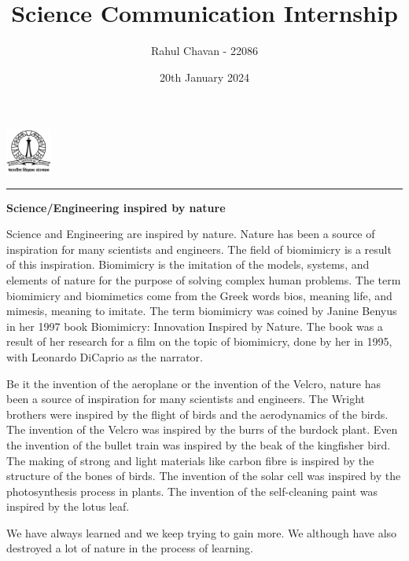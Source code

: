 \documentclass[12pt]{article}
\title{\textbf{ Science Communication Internship}}
\author{Rahul Chavan - 22086}
\date{20th January 2024}
\renewcommand{\maketitle}{
 \begin{center}
    \includegraphics[width=1.5cm]{IISc_Master_Seal_Black.jpg}
    \vspace{0.5cm}

    \Large
    \textbf{\thetitle}
    
    \vspace{0.3cm}
    
    \large
    \theauthor
    
    \vspace{0.2cm}

    
    
    \large
    \thedate
    \vspace{0.2cm}

    \hrule  
    
    
  
  \end{center}
}
\begin{document}
\maketitle
  \begin{center} \Large
    \textbf{Science/Engineering inspired by nature}
  \end{center} 

Science and Engineering are inspired by nature. Nature has been a source of inspiration for many scientists and engineers.
The field of biomimicry is a result of this inspiration. 
Biomimicry is the imitation of the models, systems, and elements of nature for the purpose 
of solving complex human problems. The term biomimicry and biomimetics come from the Greek words 
bios, meaning life, and mimesis, meaning to imitate. The term biomimicry was coined by Janine Benyus 
in her 1997 book Biomimicry: Innovation Inspired by Nature. The book was a result of her research for a 
film on the topic of biomimicry, done by her in 1995, with Leonardo DiCaprio as the narrator.

Be it the invention of the aeroplane or the invention of the Velcro, nature has been a source of inspiration for many scientists and engineers.
The Wright brothers were inspired by the flight of birds and the aerodynamics of the birds.
The invention of the Velcro was inspired by the burrs of the burdock plant.
Even the invention of the bullet train was inspired by the beak of the kingfisher bird.
The making of strong and light materials like carbon fibre is inspired by the structure of the bones of birds.
The invention of the solar cell was inspired by the photosynthesis process in plants.
The invention of the self-cleaning paint was inspired by the lotus leaf.

We have always learned and we keep trying to gain more. We although have also destroyed a lot of nature in the process of learning.
\end{document}
